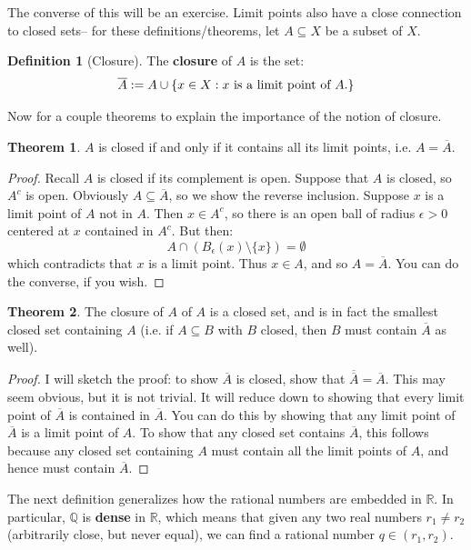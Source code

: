 \documentclass[11pt, oneside]{amsart}   	%
\theoremstyle{definition}
\newtheorem{definition}{Definition}[section]
\newtheorem{theorem}{Theorem}[section]
\begin{document}
	The converse of this will be an exercise. Limit points also have a close connection to closed sets-- for these definitions/theorems, let $A\subseteq X$ be 
	a subset of $X$.
	
	\begin{definition}[Closure]
		The \textbf{closure} of $A$ is the set:
		$$
			\overline A := A\cup\{x\in X : x\textnormal{ is a limit point of $A$.}\}
		$$
	\end{definition}
	
	Now for a couple theorems to explain the importance of the notion of closure.
	
	\begin{theorem}
		$A$ is closed if and only if it contains all its limit points, i.e. $A = \overline A$.
	\end{theorem}
	
	\begin{proof}
		Recall $A$ is closed if its complement is open. Suppose that $A$ is closed, so $A^c$ is open. Obviously $A\subseteq\overline A$, so we show the 
		reverse inclusion. Suppose $x$ is a limit point of $A$ not in $A$. Then $x	\in A^c$, so there is an open ball of radius $\epsilon > 0$ centered at $x$ 
		contained in $A^c$. But then:
		$$
			A\cap(B_\epsilon(x)\setminus\{x\}) = \emptyset
		$$
		which contradicts that $x$ is a limit point. Thus $x\in A$, and so $A = \overline A$. You can do the converse, if you wish.
	\end{proof}
	
	\begin{theorem}
		The closure of $A$ of $A$ is a closed set, and is in fact the smallest closed set containing $A$ (i.e. if $A\subseteq B$ with $B$ closed, then $B$ must 
		contain $\overline A$ as well).
	\end{theorem}
	
	\begin{proof}
		I will sketch the proof: to show $\overline A$ is closed, show that $\overline{\overline A} = \overline A$. This may seem obvious, but it is not trivial. It 
		will reduce down to showing that every limit point of $\overline A$ is contained in $\overline A$. You can do this by showing that any limit point of 
		$\overline A$ is a limit point of $A$. To show that any closed set contains $\overline A$, this follows because any closed set containing $A$ must 
		contain all the limit points of $A$, and hence must contain $\overline A$. 
	\end{proof}
	
	The next definition generalizes how the rational numbers are embedded in $\mathbb R$. In particular, $\mathbb Q$ is \textbf{dense} in $\mathbb R$, which 
	means that given any two real numbers $r_1\neq r_2$ (arbitrarily close, but never equal), we can find a rational number $q\in (r_1, r_2)$. 
	
\end{document}
